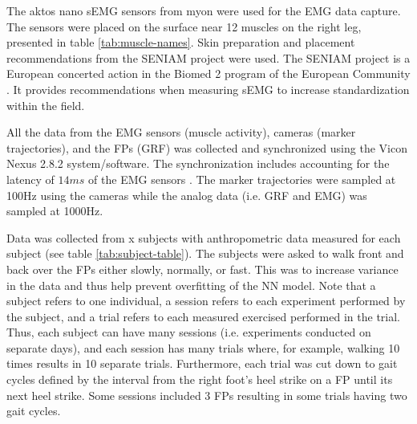 \documentclass[../main.tex]{subfiles}
\begin{document}

The aktos nano \ac{sEMG} sensors from myon were used for the \ac{EMG} data capture. 
The sensors were placed on the surface near 12 muscles on the right leg, presented in table \ref{tab:muscle-names}. Skin preparation and placement recommendations from the SENIAM project \cite{Stegeman2007, Hermens1999, Hermens2000} were used. The SENIAM project is a European concerted action in the Biomed 2 program of the European Community \cite{Stegeman2007}. It provides recommendations when measuring \ac{sEMG} to increase standardization within the field.

All the data from the \ac{EMG} sensors (muscle activity), cameras (marker trajectories), and the \acp{FP} (\ac{GRF}) was collected and synchronized using the Vicon Nexus 2.8.2 system/software.
The synchronization includes accounting for the latency of $14ms$ of the \ac{EMG} sensors \cite{aktosEMG}.
The marker trajectories were sampled at 100Hz using the cameras while the analog data (i.e. \ac{GRF} and \ac{EMG}) was sampled at 1000Hz.

Data was collected from x subjects with anthropometric data measured for each subject (see table \ref{tab:subject-table}).
The subjects were asked to walk front and back over the \acp{FP} either slowly, normally, or fast.
This was to increase variance in the data and thus help prevent overfitting of the \ac{NN} model.
Note that a subject refers to one individual, a session refers to each experiment performed by the subject, and a trial refers to each measured exercised performed in the trial. 
Thus, each subject can have many sessions (i.e. experiments conducted on separate days), and each session has many trials where, for example, walking 10 times results in 10 separate trials.
Furthermore, each trial was cut down to gait cycles defined by the interval from the right foot's heel strike on a \ac{FP} until its next heel strike.
Some sessions included 3 \acp{FP} resulting in some trials having two gait cycles.

\end{document}
